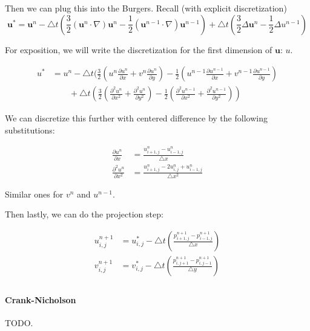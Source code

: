 \documentclass[12pt]{article}
\begin{document}
Then we can plug this into the Burgers. Recall (with explicit discretization)
\begin{equation}
    \mathbf{u}^* = \mathbf{u}^n - \bigtriangleup t (\frac{3}{2}(\mathbf{u}^n \cdot \nabla)\mathbf{u}^n - \frac{1}{2}(\mathbf{u}^{n-1} \cdot \nabla)\mathbf{u}^{n-1}) + \bigtriangleup t (\frac{3}{2}\Delta \mathbf{u}^n - \frac{1}{2} \Delta u^{n-1})
\end{equation}

For exposition, we will write the discretization for the first dimension of $\mathbf{u}$: $u$.

\begin{align*}
u^* &= u^n - \bigtriangleup t (\frac{3}{2}(u^n\frac{\partial u^n}{\partial x} + v^n \frac{\partial u^n}{\partial y}) - \frac{1}{2}(u^{n-1}\frac{\partial u^{n-1}}{\partial x} + v^{n-1} \frac{\partial u^{n-1}}{\partial y}) \\
    &\qquad + \bigtriangleup t (\frac{3}{2}(\frac{\partial^2 u^n}{\partial x^2} + \frac{\partial^2 u^n}{\partial y^2}) - \frac{1}{2}(\frac{\partial^2 u^{n-1}}{\partial x^2} + \frac{\partial^2 u^{n-1}}{\partial y^2}))
\end{align*}

We can discretize this further with centered difference by the following substitutions:

\begin{align*}
    \frac{\partial u^n}{\partial x} &= \frac{u^n_{i+1,j} - u^n_{i-1,j}}{\bigtriangleup x} \\
    \frac{\partial^2 u^n}{\partial x^2} &= \frac{u^n_{i+1,j} - 2u^n_{i,j} + u^n_{i-1,j}}{\bigtriangleup x^2}
\end{align*}

Similar ones for $v^n$ and $u^{n-1}$.

Then lastly, we can do the projection step:

\begin{align*}
    u^{n+1}_{i,j} &= u^*_{i,j} - \bigtriangleup t (\frac{p^{n+1}_{i+1,j} - p^{n+1}_{i-1,j}}{\bigtriangleup x}) \\
    v^{n+1}_{i,j} &= v^*_{i,j} - \bigtriangleup t (\frac{p^{n+1}_{i,j+1} - p^{n+1}_{i,j-1}}{\bigtriangleup y}) \\
\end{align*}

\paragraph{Crank-Nicholson} TODO.
\end{document}
